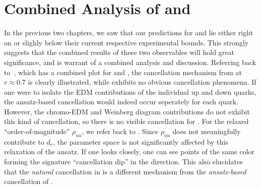 \chapter{Combined Analysis of {\eedm} and {\nedm}}
\label{ch:combined-eEDM-nEDM}

In the previous two chapters, we saw that our {\gthdm} predictions for {\eedm} and {\nedm} lie either right on or slighly below their current respective experimental bounds.
This strongly suggests that the combined results of these two observables will hold great significance,
and is warrant of a combined analysis and discussion.
Referring back to~, which has a combined plot for {\eedm} and {\nedm},
the {\eedm} cancellation mechanism from  at \(r \approx 0.7 \) is clearly illustrated,
while {\nedm} exhibits no obvious cancellation phenomena.
If one were to isolate the EDM contributions of the individual up and down quarks,
the ansatz-based cancellation would indeed occur seperately for each quark.
However, the chromo-EDM and Weinberg diagram contributions do not exhibit this kind of cancellation,
so there is no visible cancellation for {\nedm}.
For the relaxed ``order-of-magnitude'' \(\rho_{uu} \), we refer back to .
Since \(\rho_{uu} \) does not meaningfully contribute to \(d_{e} \), 
the {\eedm} parameter space is not significantly affected by this relaxation of the ansatz.
If one looks closely, one can see points of the same color forming the signature ``cancellation dip'' in the {\eedm} direction.
This also elucidates that the \emph{natural} cancellation in {\nedm} is a different mechanism from the \emph{ansatz-based} cancellation of {\eedm}.

